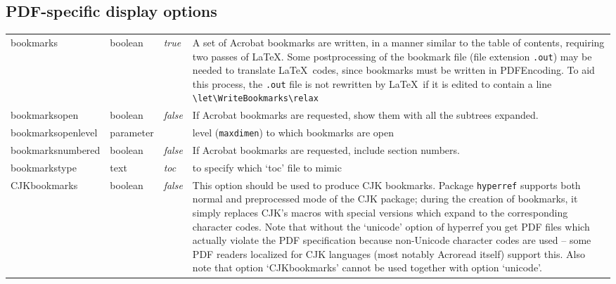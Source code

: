 \documentclass[pdftex]{article}
\newcommand*{\xpackage}[1]{\textsf{#1}}
\newcommand{\bs}{\symbol{'134}}%
\newcommand{\ci}[1]{\texttt{\bs#1}}
\begin{document}
\subsection{PDF-specific display options}
\begin{longtable}{@{}>{\ttfamily}ll>{\itshape}lp{7.5cm}@{}}
bookmarks          & boolean   & true   & A set of Acrobat bookmarks are written, in a manner similar to the
                                           table of contents, requiring two passes of \LaTeX. Some postprocessing
                                           of the bookmark file (file extension \texttt{.out}) may be needed to
                                           translate \LaTeX\ codes, since bookmarks must be written in  PDFEncoding.
                                           To aid this  process, the \texttt{.out} file is not rewritten by \LaTeX\
                                           if it is edited to contain a line \verb|\let\WriteBookmarks\relax| \\
bookmarksopen      & boolean   & false   & If Acrobat bookmarks are requested, show them with all the subtrees
                                           expanded. \\
bookmarksopenlevel & parameter &         & level (\ci{maxdimen}) to which bookmarks are open \\
bookmarksnumbered  & boolean   & false   & If Acrobat bookmarks are requested, include section numbers. \\
bookmarkstype      & text      & toc     & to specify which `toc' file to mimic \\
CJKbookmarks       & boolean   & false   &
    This option should be used to produce CJK bookmarks.
    Package \verb|hyperref|
    supports both normal and preprocessed mode of the \xpackage{CJK} package;
    during the creation of bookmarks, it simply replaces CJK's macros
    with special versions which expand to the corresponding character
    codes.  Note that without the `unicode' option of hyperref you get
    PDF files which actually violate the PDF specification because
    non-Unicode character codes are used -- some PDF readers localized
    for CJK languages (most notably Acroread itself) support this.
    Also note that option `CJKbookmarks' cannot be used together
    with option `unicode'.


\end{longtable}
\end{document}
